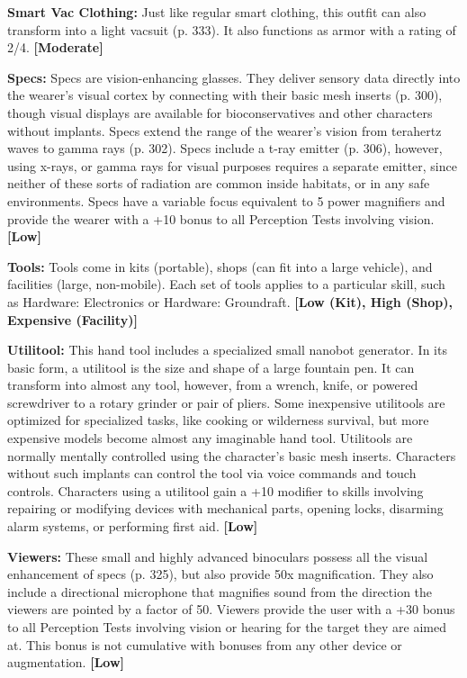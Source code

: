 \textbf{Smart Vac Clothing:} Just like regular smart clothing, this outfit can also transform into a light vacsuit (p. 333). It also functions as armor with a rating of 2/4. \textbf{[Moderate]}

\textbf{Specs:} Specs are vision-enhancing glasses. They deliver sensory data directly into the wearer’s visual cortex by connecting with their basic mesh inserts (p. 300), though visual displays are available for bioconservatives and other characters without implants. Specs extend the range of the wearer’s vision from terahertz waves to gamma rays (p. 302). Specs include a t-ray emitter (p. 306), however, using x-rays, or gamma rays for visual purposes requires a separate emitter, since neither of these sorts of radiation are common inside habitats, or in any safe environments. Specs have a variable focus equivalent to 5 power magnifiers and provide the wearer with a +10 bonus to all Perception Tests involving vision. \textbf{[Low]}

\textbf{Tools:} Tools come in kits (portable), shops (can fit into a large vehicle), and facilities (large, non-mobile). Each set of tools applies to a particular skill, such as Hardware: Electronics or Hardware: Groundraft. \textbf{[Low (Kit), High (Shop), Expensive (Facility)]}

\textbf{Utilitool:} This hand tool includes a specialized small nanobot generator. In its basic form, a utilitool is the size and shape of a large fountain pen. It can transform into almost any tool, however, from a wrench, knife, or powered screwdriver to a rotary grinder or pair of pliers. Some inexpensive utilitools are optimized for specialized tasks, like cooking or wilderness survival, but more expensive models become almost any imaginable hand tool. Utilitools are normally mentally controlled using the character’s basic mesh inserts. Characters without such implants can control the tool via voice commands and touch controls. Characters using a utilitool gain a +10 modifier to skills involving repairing or modifying devices with mechanical parts, opening locks, disarming alarm systems, or performing first aid. \textbf{[Low]}

\textbf{Viewers:} These small and highly advanced binoculars possess all the visual enhancement of specs (p. 325), but also provide 50x magnification. They also include a directional microphone that magnifies sound from the direction the viewers are pointed by a factor of 50. Viewers provide the user with a +30 bonus to all Perception Tests involving vision or hearing for the target they are aimed at. This bonus is not cumulative with bonuses from any other device or augmentation. \textbf{[Low]}


